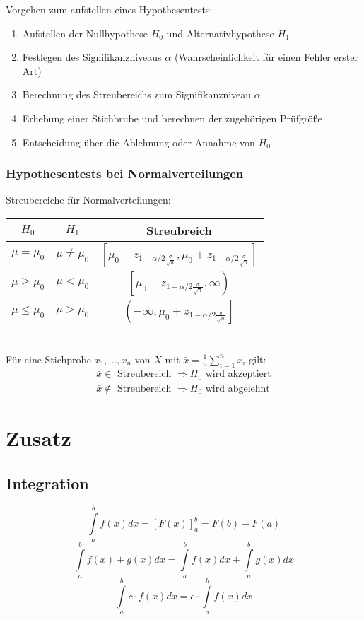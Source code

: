 \documentclass[12pt]{article}
\begin{document}
Vorgehen zum aufstellen eines Hypothesentests:
\begin{enumerate}
	\item Aufstellen der Nullhypothese $H_0$ und Alternativhypothese $H_1$
	\item Festlegen des Signifikanzniveaus $\alpha$ (Wahrscheinlichkeit für einen Fehler erster Art)
	\item Berechnung des Streubereichs zum Signifikanzniveau $\alpha$
	\item Erhebung einer Stichbrube und berechnen der zugehörigen Prüfgröße
	\item Entscheidung über die Ablehnung oder Annahme von $H_0$
\end{enumerate}
\subsubsection{Hypothesentests bei Normalverteilungen}
Streubereiche für Normalverteilungen:\\
\begin{tabular}{|c|c|c|}
	\hline
	\textbf{$H_0$} & \textbf{$H_1$} & \textbf{Streubreich}\\\hline
	$\mu=\mu_0$ & $\mu\neq\mu_0$ & $\left[\mu_0-z_{1-\alpha/2\frac{\sigma}{\sqrt{n}}}, \mu_0+z_{1-\alpha/2\frac{\sigma}{\sqrt{n}}}\right]$\\\hline
	$\mu\geq\mu_0$ & $\mu<\mu_0$ & $\left[\mu_0-z_{1-\alpha/2\frac{\sigma}{\sqrt{n}}}, \infty\right)$\\\hline
	$\mu\leq\mu_0$ & $\mu>\mu_0$ & $\left(-\infty, \mu_0+z_{1-\alpha/2\frac{\sigma}{\sqrt{n}}}\right]$\\\hline
\end{tabular}\\
Für eine Stichprobe $x_1,...,x_n$ von $X$ mit $\bar{x}=\frac{1}{n}\sum_{i=1}^nx_i$ gilt:
\begin{gather*}
	\bar{x}\in \text{ Streubereich }\Rightarrow H_0 \text{ wird akzeptiert}\\
	\bar{x}\notin \text{ Streubereich }\Rightarrow H_0 \text{ wird abgelehnt}
\end{gather*}
\section{Zusatz}
\subsection{Integration}
\begin{equation*}
	\int\limits_{a}^{b}f(x) dx = [F(x)]_a^b = F(b) - F(a)
\end{equation*}
\begin{equation*}
	\int\limits_{a}^{b}f(x) + g(x) dx = \int\limits_{a}^{b}f(x) dx + \int\limits_{a}^{b}g(x) dx
\end{equation*}
\begin{equation*}
	\int\limits_{a}^{b}c\cdot f(x) dx = c\cdot \int\limits_{a}^{b}f(x) dx
\end{equation*}
\end{document}

